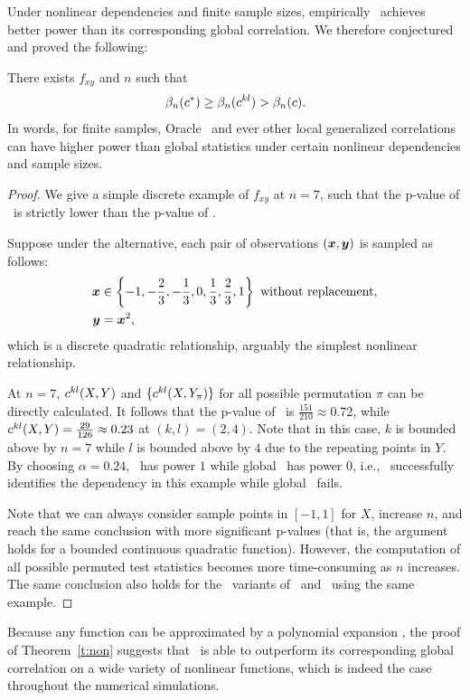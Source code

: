 \documentclass[11pt]{article}
\begin{document}
Under nonlinear dependencies and finite sample sizes, empirically \Mgc~achieves better power than its corresponding global correlation. 
We therefore conjectured and proved the following:
\begin{thm}
\label{t:non}
There exists $f_{xy}$ and $n$ such that
\begin{equation}
\beta_n(c^*) \geq \beta_n(c^{kl}) > \beta_n(c).
\end{equation}
In words, for finite samples, Oracle \Mgc~and ever other local generalized correlations can have higher power than global statistics under certain nonlinear dependencies and sample sizes.
\end{thm}
\begin{proof}
We give a simple discrete example of $f_{xy}$ at $n=7$, such that the p-value of \Mgc~is strictly lower than the p-value of \Mcorr.

Suppose under the alternative, each pair of observations $(\boldsymbol{x},\boldsymbol{y})$ is sampled as follows:
\begin{align*}
\boldsymbol{x} &\in \left\{-1,-\frac{2}{3},-\frac{1}{3},0,\frac{1}{3},\frac{2}{3},1\right\} \mbox{ without replacement}, \\
\boldsymbol{y} &= \boldsymbol{x}^2,
\end{align*}
which is a discrete quadratic relationship, arguably the simplest nonlinear relationship. 

At $n=7$, $c^{kl}(X, Y)$ and $\{c^{kl}(X, Y_{\pi})\}$ for all possible permutation $\pi$ can be directly calculated. 
It follows that the p-value of \Mcorr~is $\frac{151}{210} \approx 0.72$, while $c^{kl}(X, Y)=\frac{29}{126} \approx 0.23$ at $(k,l)=(2,4)$. Note that in this case, $k$ is bounded above by $n=7$ while $l$ is bounded above by $4$ due to the repeating points in $Y$. 
By choosing $\alpha = 0.24$, \Mgc~has power $1$ while global \Mcorr~has power $0$, i.e., \Mgc~successfully identifies the dependency in this example while global \Mcorr~fails.

Note that we can always consider sample points in $[-1,1]$ for $X$, increase $n$, and reach the same conclusion with more significant p-values (that is, the argument holds for a bounded continuous quadratic function). 
However, the computation of all possible permuted test statistics becomes more time-consuming as $n$ increases. The same conclusion also holds for the \Mgc~variants of \Dcorr~and \Mantel~using the same example.
\end{proof}

Because any function can be approximated by a polynomial expansion \cite{RudinBook}, the proof of Theorem~\ref{t:non} suggests that \Mgc~is able to outperform its corresponding global correlation on a wide variety of nonlinear functions, which is indeed the case throughout the numerical simulations. 
\end{document}
